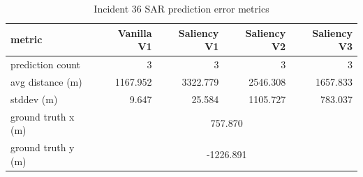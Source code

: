 \begin{table}[ht]
\centering
\caption{Incident 36 SAR prediction error metrics}
\label{tab:sar-incident-36}
\begin{tabular}{lrrrr}
\hline
metric & Vanilla V1 & Saliency V1 & Saliency V2 & Saliency V3 \\
\hline
prediction count & 3 & 3 & 3 & 3 \\
avg distance (m) & 1167.952 & 3322.779 & 2546.308 & 1657.833 \\
stddev (m) & 9.647 & 25.584 & 1105.727 & 783.037 \\
ground truth x (m) & \multicolumn{4}{c}{757.870} \\
ground truth y (m) & \multicolumn{4}{c}{-1226.891} \\
\hline
\end{tabular}
\end{table}
